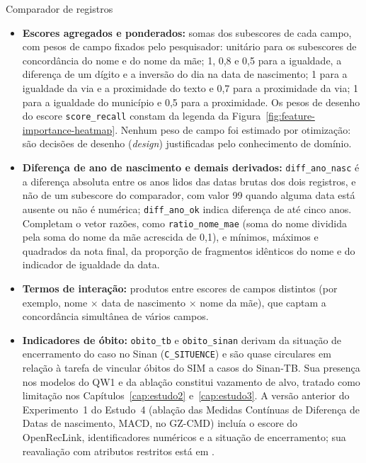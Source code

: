 \begin{chapter}{Comparador de registros}
\begin{sloppypar}
\begin{itemize}
\item \textbf{Escores agregados e ponderados:} somas dos subescores de cada campo, com pesos de campo fixados pelo pesquisador: unitário para os subescores de concordância do nome e do nome da mãe; 1, 0,8 e 0,5 para a igualdade, a diferença de um dígito e a inversão do dia na data de nascimento; 1 para a igualdade da via e a proximidade do texto e 0,7 para a proximidade da via; 1 para a igualdade do município e 0,5 para a proximidade. Os pesos de desenho do escore \texttt{score\_recall} constam da legenda da Figura~\ref{fig:feature-importance-heatmap}. Nenhum peso de campo foi estimado por otimização: são decisões de desenho (\textit{design}) justificadas pelo conhecimento de domínio.

\item \textbf{Diferença de ano de nascimento e demais derivados:} \texttt{diff\_ano\_nasc} é a diferença absoluta entre os anos lidos das datas brutas dos dois registros, e não de um subescore do comparador, com valor 99 quando alguma data está ausente ou não é numérica; \texttt{diff\_ano\_ok} indica diferença de até cinco anos. Completam o vetor razões, como \texttt{ratio\_nome\_mae} (soma do nome dividida pela soma do nome da mãe acrescida de 0,1), e mínimos, máximos e quadrados da nota final, da proporção de fragmentos idênticos do nome e do indicador de igualdade da data.

\item \textbf{Termos de interação:} produtos entre escores de campos distintos (por exemplo, nome $\times$ data de nascimento $\times$ nome da mãe), que captam a concordância simultânea de vários campos.

\item \textbf{Indicadores de óbito:} \texttt{obito\_tb} e \texttt{obito\_sinan} derivam da situação de encerramento do caso no Sinan (\texttt{C\_SITUENCE}) e são quase circulares em relação à tarefa de vincular óbitos do SIM a casos do Sinan-TB. Sua presença nos modelos do QW1 e da ablação constitui vazamento de alvo, tratado como limitação nos Capítulos~\ref{cap:estudo2} e~\ref{cap:estudo3}. A versão anterior do Experimento~1 do Estudo~4 (ablação das Medidas Contínuas de Diferença de Datas de nascimento, MACD, no GZ-CMD) incluía o escore do OpenRecLink, identificadores numéricos e a situação de encerramento; sua reavaliação com atributos restritos está em .
\end{itemize}
\end{sloppypar}


\end{chapter}
